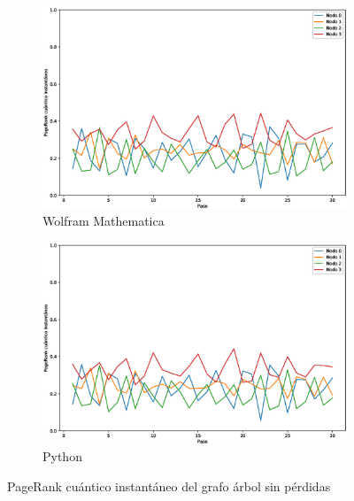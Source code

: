 \documentclass[xetex,mathserif,serif]{beamer}
\begin{document}
\begin{frame}
\begin{figure}[H]
    \centering
    \begin{subfigure}[m]{0.45\textwidth}
        \centering
        \includegraphics[width=0.9\linewidth]{img/tree-inst-M.eps}
        \caption{Wolfram Mathematica}
    \end{subfigure}
    \begin{subfigure}[m]{0.45\textwidth}
        \centering
        \includegraphics[width=0.9\linewidth]{img/tree-inst-lossless.eps}
        \caption{Python}
    \end{subfigure}
    \caption[PageRank cuántico instantáneo del grafo árbol sin pérdidas]{PageRank cuántico instantáneo del grafo árbol sin pérdidas}
    \label{fig:insttreelossless}
\end{figure}


\end{frame}
\end{document}
